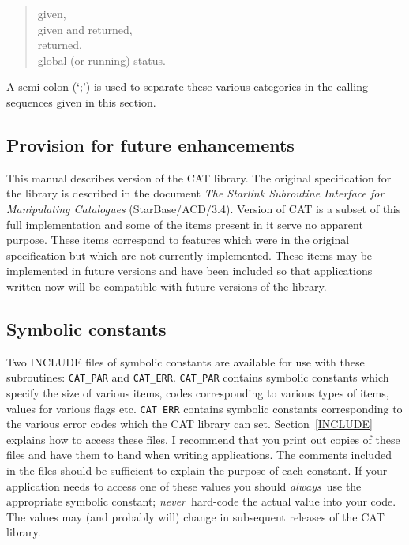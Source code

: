 \begin{verse}
given,  \\
given and returned,  \\
returned,  \\
global (or running) status.
\end{verse}

A semi-colon (`;') is used to separate these various categories in the
calling sequences given in this section.


\subsection{Provision for future enhancements}

This manual describes version \CATversion of the CAT library.  The
original specification for the library is described in the document {\it
The Starlink Subroutine Interface for Manipulating Catalogues}\/
(StarBase/ACD/3.4)\cite{STARBASE34}.  Version \CATversion of CAT is a
subset of this full implementation and some of the items present in it
serve no apparent purpose.  These items correspond to features which were
in the original specification but which are not currently implemented.
These items may be implemented in future versions and have been included
so that applications written now will be compatible with future versions
of the library.

\subsection{Symbolic constants}

Two INCLUDE files of symbolic constants are available for use with these
subroutines: {\tt CAT\_PAR} and {\tt CAT\_ERR}. {\tt CAT\_PAR} contains
symbolic constants which specify the size of various items, codes
corresponding to various types of items, values for various flags etc.
{\tt CAT\_ERR} contains symbolic constants corresponding to the various
error codes which the CAT library can set. Section~\ref{INCLUDE} 
explains how to access these files. I recommend that you print out 
copies of these files and have them to hand when writing applications.
The comments included in the files should be sufficient to explain the
purpose of each constant. If your application needs to access one of
these values you should {\it always}\, use the appropriate symbolic 
constant; {\it never}\, hard-code the actual value into your code. 
The values may (and probably will) change in subsequent releases of 
the CAT library.



